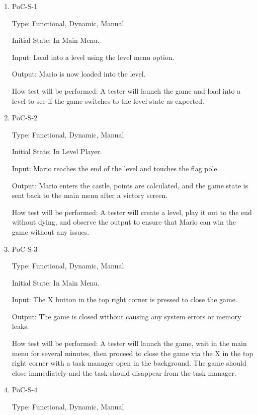 \documentclass[12pt, titlepage]{article}
\begin{document}
\begin{enumerate}

\item{PoC-S-1\\}

Type: Functional, Dynamic, Manual
					
Initial State: In Main Menu.
					
Input: Load into a level using the level menu option.
					
Output: Mario is now loaded into the level.
					
How test will be performed: A tester will launch the game and load into a level to see if the game switches to the level state as expected.
					
\item{PoC-S-2\\}

Type: Functional, Dynamic, Manual
					
Initial State: In Level Player.
					
Input: Mario reaches the end of the level and touches the flag pole.
					
Output: Mario enters the castle, points are calculated, and the game state is sent back to the main menu after a victory screen.
					
How test will be performed: A tester will create a level, play it out to the end without dying, and observe the output to ensure that Mario can win the game without any issues.
					
\item{PoC-S-3\\}

Type: Functional, Dynamic, Manual
					
Initial State: In Main Menu.
					
Input: The X button in the top right corner is pressed to close the game.
					
Output: The game is closed without causing any system errors or memory leaks.
					
How test will be performed: A tester will launch the game, wait in the main menu for several minutes, then proceed to close the game via the X in the top right corner with a task manager open in the background. The game should close immediately and the task should disappear from the task manager.


\item{PoC-S-4\\}

Type: Functional, Dynamic, Manual
					

\end{enumerate}
\end{document}
